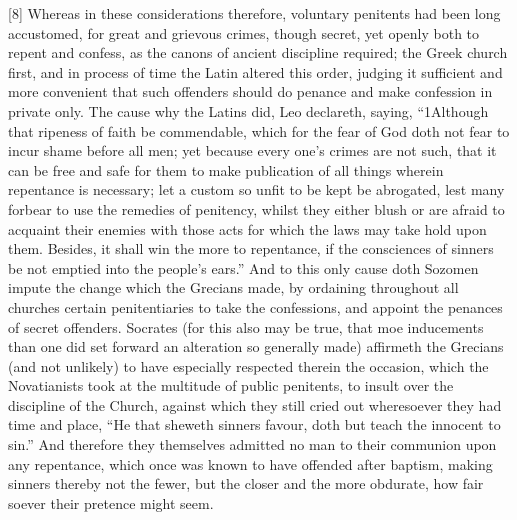[8] Whereas in these considerations therefore, voluntary penitents had been long accustomed, for great and grievous crimes, though secret, yet openly both to repent and confess, as the canons of ancient discipline required; the Greek church first, and in process of time the Latin altered this order, judging it sufficient and more convenient that such offenders should do penance and make confession in private only. The cause why the Latins did, Leo declareth, saying,  “1Although that ripeness of faith be commendable, which for the fear of God doth not fear to incur shame before all men; yet because every one’s crimes are not such, that it can be free and safe for them to make publication of all things wherein repentance is necessary; let a custom so unfit to be kept be abrogated, lest many forbear to use the remedies of penitency, whilst they either blush or are afraid to acquaint their enemies with those acts for which the laws may take hold upon them. Besides, it shall win the more to repentance, if the consciences of sinners be not emptied into the people’s ears.” And to this only cause doth Sozomen impute the change which the Grecians made, by ordaining throughout all churches certain penitentiaries to take the confessions, and appoint the penances of secret offenders. Socrates (for this also may be true, that moe inducements than one did set forward an alteration so generally made) affirmeth the Grecians (and not unlikely) to have especially respected therein the occasion, which the Novatianists took at the multitude of public penitents, to insult over the discipline of the Church, against which they still cried out wheresoever they had time and place, “He that sheweth sinners favour, doth but teach the innocent to  sin.” And therefore they themselves admitted no man to their communion upon any repentance, which once was known to have offended after baptism, making sinners thereby not the fewer, but the closer and the more obdurate, how fair soever their pretence might seem.

